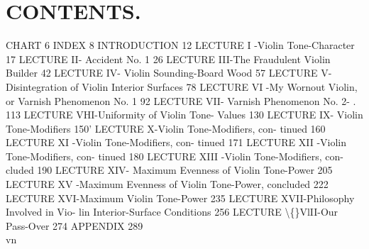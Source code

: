 \chapter{CONTENTS.}

CHART 6 INDEX 8 INTRODUCTION 12 LECTURE I -Violin Tone-Character 17 LECTURE II- Accident No. 1 26 LECTURE III-The Fraudulent Violin Builder 42 LECTURE IV- Violin Sounding-Board Wood 57 LECTURE V-Disintegration of Violin Interior Surfaces 78 LECTURE VI -My Wornout Violin, or Varnish Phenomenon No. 1 92 LECTURE VII- Varnish Phenomenon No. 2- . 113 LECTURE VHI-Uniformity of Violin Tone- Values 130 LECTURE IX- Violin Tone-Modifiers 150' LECTURE X-Violin Tone-Modifiers, con- tinued 160 LECTURE XI -Violin Tone-Modifiers, con- tinued 171 LECTURE XII -Violin Tone-Modifiers, con- tinued 180 LECTURE XIII -Violin Tone-Modifiers, con- cluded 190 LECTURE XIV- Maximum Evenness of Violin Tone-Power 205 LECTURE XV -Maximum Evenness of Violin Tone-Power, concluded 222 LECTURE XVI-Maximum Violin Tone-Power 235 LECTURE XVII-Philosophy Involved in Vio- lin Interior-Surface Conditions 256 LECTURE \textbackslash\{\}VlII-Our Pass-Over 274 APPENDIX 289\\
vn\\